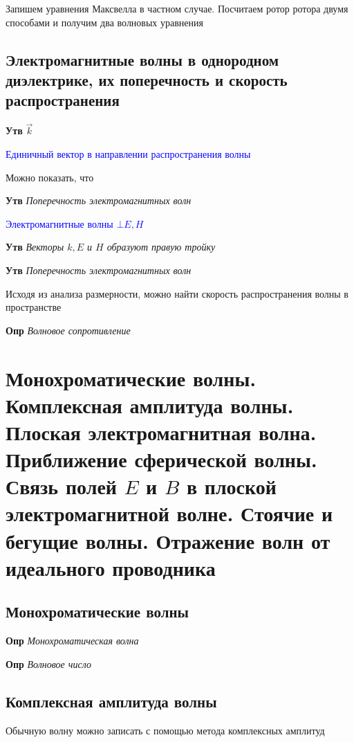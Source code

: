 \documentclass[a4paper, 14pt]{article}
\begin{document}
    Запишем уравнения Максвелла в частном случае.
    Посчитаем ротор ротора двумя способами и получим два волновых уравнения
    
    \subsection{Электромагнитные волны в однородном диэлектрике, их поперечность и скорость распространения}
    
    \textbf{Утв} \textit{$\overrightarrow{k}$}
    
    \textcolor{blue}{Единичный вектор в направлении распространения волны}
    
    Можно показать, что
    
    \textbf{Утв} \textit{Поперечность электромагнитных волн}
    
    \textcolor{blue}{Электромагнитные волны $\bot E, H$}
    
    \textbf{Утв} \textit{Векторы $k, E$ и $H$ образуют правую тройку}
    
    \textbf{Утв} \textit{Поперечность электромагнитных волн}
    
    Исходя из анализа размерности, можно найти скорость распространения волны в пространстве
    
    \textbf{Опр} \textit{Волновое сопротивление}
    
    \section{Монохроматические волны.
    Комплексная амплитуда волны.
    Плоская электромагнитная волна.
    Приближение сферической волны.
    Связь полей $E$ и $B$ в плоской электромагнитной волне.
    Стоячие и бегущие волны.
    Отражение волн от идеального проводника}
    
    \subsection{Монохроматические волны}
    
    \textbf{Опр} \textit{Монохроматическая волна}
    
    \textbf{Опр} \textit{Волновое число}
    
    \subsection{Комплексная амплитуда волны}
    
    Обычную волну можно записать с помощью метода комплексных амплитуд
    
\end{document}
